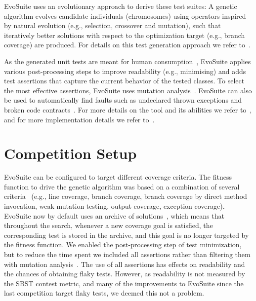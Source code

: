 \documentclass[10pt,conference,compsocconf]{IEEEtran}
\newcommand{\EVOSUITE}{{\sc EvoSuite}\xspace}
\begin{document}
\EVOSUITE uses an evolutionary approach to derive these test suites: A
genetic algorithm evolves candidate individuals (chromosomes) using
operators inspired by natural evolution (e.g., selection, crossover
and mutation), such that iteratively better solutions with respect to
the optimization target (e.g., branch coverage) are produced.  For
details on this test generation approach we refer to~\cite{GoA_TSE12}.


As the generated unit tests are meant for human
consumption~\cite{fraser2013does}, \EVOSUITE applies various
post-processing steps to improve readability (e.g., minimising) and
adds test assertions that capture the current behavior of the tested
classes. To select the most effective assertions, \EVOSUITE uses
mutation analysis~\cite{10.1109/TSE.2011.93}.  \EVOSUITE can also be
used to automatically find faults such as undeclared thrown exceptions
and broken code contracts~\cite{emse13_oracle}.  For more details on
the tool and its abilities we refer to~\cite{FrA11c}, and for more
implementation details we refer to~\cite{FrA13a}.

\section{Competition Setup}

\EVOSUITE can be configured to target different coverage criteria. The
fitness function to drive the genetic algorithm was based on a
combination of several criteria~\cite{rojas2015combining} (e.g., line
coverage, branch coverage, branch coverage by direct method
invocation, weak mutation testing, output coverage, exception
coverage). \EVOSUITE now by default uses an archive of
solutions~\cite{emse_archive}, which means that throughout the search,
whenever a new coverage goal is satisfied, the corresponding test is
stored in the archive, and this goal is no longer targeted by the
fitness function. We enabled the post-processing step of test
minimization, but to reduce the time spent we included all assertions
rather than filtering them with mutation
analysis~\cite{10.1109/TSE.2011.93}. The use of all assertions has
effects on readability and the chances of obtaining flaky
tests. However, as readability is not measured by the SBST contest
metric, and many of the improvements to \EVOSUITE since the last
competition target flaky tests, we deemed this not a problem.
\end{document}
